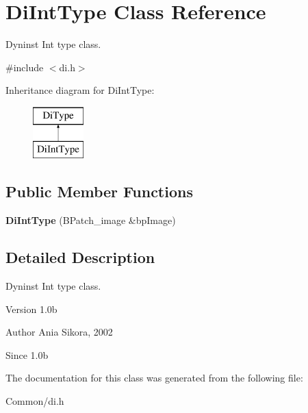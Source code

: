 \hypertarget{class_di_int_type}{\section{Di\-Int\-Type Class Reference}
\label{class_di_int_type}
}


Dyninst Int type class.  




{\ttfamily \#include $<$di.\-h$>$}

Inheritance diagram for Di\-Int\-Type\-:\begin{figure}[H]
\begin{center}
\leavevmode
\includegraphics[height=2.000000cm]{class_di_int_type}
\end{center}
\end{figure}
\subsection*{Public Member Functions}
\begin{DoxyCompactItemize}
\item 
\hypertarget{class_di_int_type_aeb0ad81c8fe515c5abbb44a0c6c43c9b}{{\bfseries Di\-Int\-Type} (B\-Patch\-\_\-image \&bp\-Image)}\label{class_di_int_type_aeb0ad81c8fe515c5abbb44a0c6c43c9b}

\end{DoxyCompactItemize}


\subsection{Detailed Description}
Dyninst Int type class. 

\begin{DoxyVersion}{Version}
1.\-0b 
\end{DoxyVersion}
\begin{DoxyAuthor}{Author}
Ania Sikora, 2002 
\end{DoxyAuthor}
\begin{DoxySince}{Since}
1.\-0b 
\end{DoxySince}


The documentation for this class was generated from the following file\-:\begin{DoxyCompactItemize}
\item 
Common/di.\-h\end{DoxyCompactItemize}
